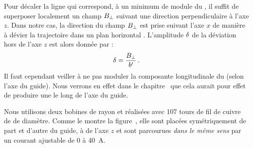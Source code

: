 Pour décaler la ligne qui correspond, à un minimum de module du \chm, il suffit de superposer localement un champ ${B_{\rm \bot}}$ %
%
suivant une direction perpendiculaire à l'axe $z$. Dans notre cas, la direction du champ ${B_{\rm \bot}}$ est prise suivant l'axe $x$ de manière à dévier la trajectoire dans un plan horizontal%
.
L'amplitude ${\delta}$ de la déviation hors de l'axe $z$ est alors donnée par :
\begin{equation}
	\Devi = \frac{\CeramBtrans}{\gradB}
\pointformule
\label{eq:Devi}
\end{equation}
Il faut cependant veiller à ne pas moduler la composante longitudinale du \chm (selon l'axe du guide). Nous verrons en effet dans le chapitre~ que cela aurait pour effet de produire une \bapot le long de l'axe du guide. 

Nous utilisons deux bobines de rayon  et réalisées avec 107 tours de fil de cuivre de  de diamètre. Comme le montre la figure~, elle sont placées symétriquement de part et d'autre du guide, à  de l'axe $z$%
 et sont parcourues \emph{dans le même sens} par un courant ajustable de $0$ à \SI{40}{\ampere}. 
\bfigh
{}
\label{fig:GuideChampTransBobines}
\efigh

